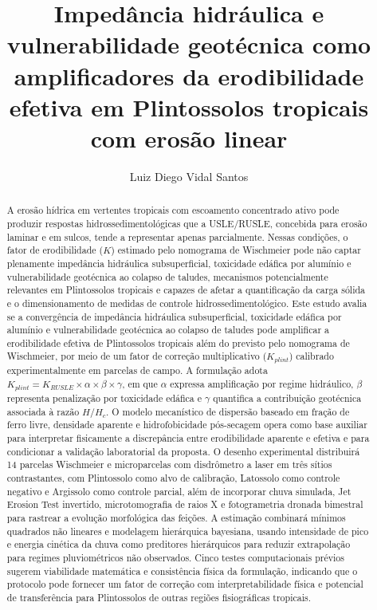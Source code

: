 \documentclass[
  brazilian,
  authoryear,
  preprint]{elsarticle}
\begin{document}
\begin{frontmatter}
\title{Impedância hidráulica e vulnerabilidade geotécnica como
amplificadores da erodibilidade efetiva em Plintossolos tropicais com
erosão linear}
\author[1]{Luiz Diego Vidal Santos%
%
}



        
\begin{abstract}
A erosão hídrica em vertentes tropicais com escoamento concentrado ativo
pode produzir respostas hidrossedimentológicas que a USLE/RUSLE,
concebida para erosão laminar e em sulcos, tende a representar apenas
parcialmente. Nessas condições, o fator de erodibilidade (\(K\))
estimado pelo nomograma de Wischmeier pode não captar plenamente
impedância hidráulica subsuperficial, toxicidade edáfica por alumínio e
vulnerabilidade geotécnica ao colapso de taludes, mecanismos
potencialmente relevantes em Plintossolos tropicais e capazes de afetar
a quantificação da carga sólida e o dimensionamento de medidas de
controle hidrossedimentológico. Este estudo avalia se a convergência de
impedância hidráulica subsuperficial, toxicidade edáfica por alumínio e
vulnerabilidade geotécnica ao colapso de taludes pode amplificar a
erodibilidade efetiva de Plintossolos tropicais além do previsto pelo
nomograma de Wischmeier, por meio de um fator de correção multiplicativo
(\(K_{plint}\)) calibrado experimentalmente em parcelas de campo. A
formulação adota
\(K_{plint} = K_{RUSLE} \times \alpha \times \beta \times \gamma\), em
que \(\alpha\) expressa amplificação por regime hidráulico, \(\beta\)
representa penalização por toxicidade edáfica e \(\gamma\) quantifica a
contribuição geotécnica associada à razão \(H/H_c\). O modelo
mecanístico de dispersão baseado em fração de ferro livre, densidade
aparente e hidrofobicidade pós-secagem opera como base auxiliar para
interpretar fisicamente a discrepância entre erodibilidade aparente e
efetiva e para condicionar a validação laboratorial da proposta. O
desenho experimental distribuirá 14 parcelas Wischmeier e microparcelas
com disdrômetro a laser em três sítios contrastantes, com Plintossolo
como alvo de calibração, Latossolo como controle negativo e Argissolo
como controle parcial, além de incorporar chuva simulada, Jet Erosion
Test invertido, microtomografia de raios X e fotogrametria dronada
bimestral para rastrear a evolução morfológica das feições. A estimação
combinará mínimos quadrados não lineares e modelagem hierárquica
bayesiana, usando intensidade de pico e energia cinética da chuva como
preditores hierárquicos para reduzir extrapolação para regimes
pluviométricos não observados. Cinco testes computacionais prévios
sugerem viabilidade matemática e consistência física da formulação,
indicando que o protocolo pode fornecer um fator de correção com
interpretabilidade física e potencial de transferência para Plintossolos
de outras regiões fisiográficas tropicais.
\end{abstract}






\end{frontmatter}
\end{document}
